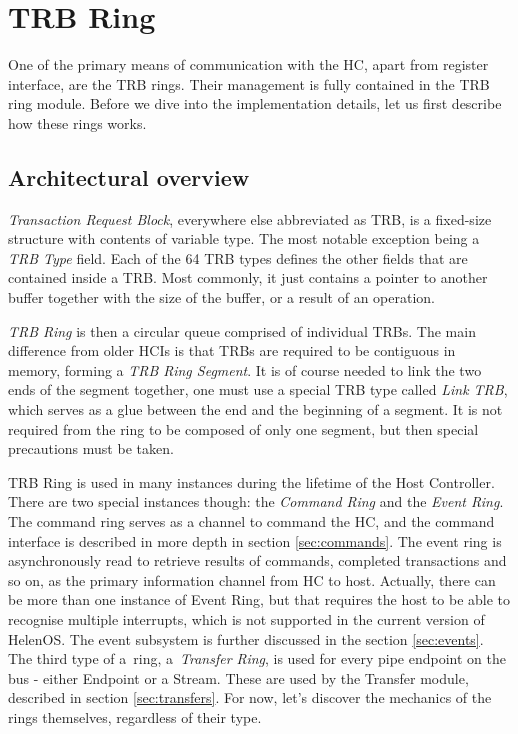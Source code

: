 \section{TRB Ring}

One of the primary means of communication with the HC, apart from register
interface, are the TRB rings. Their management is fully contained in the TRB
ring module. Before we dive into the implementation details, let us first
describe how these rings works.

\subsection{Architectural overview}

\emph{Transaction Request Block}, everywhere else abbreviated as TRB, is
a fixed-size structure with contents of variable type. The most notable
exception being a \emph{TRB Type} field. Each of the 64 TRB types defines the
other fields that are contained inside a TRB. Most commonly, it just contains
a pointer to another buffer together with the size of the buffer, or a result
of an operation.

\emph{TRB Ring} is then a circular queue comprised of individual TRBs. The main
difference from older HCIs is that TRBs are required to be contiguous in
memory, forming a \emph{TRB Ring Segment}. It is of course needed to link the
two ends of the segment together, one must use a special TRB type called
\emph{Link TRB}, which serves as a glue between the end and the beginning of
a segment. It is not required from the ring to be composed of only one segment,
but then special precautions must be taken.

TRB Ring is used in many instances during the lifetime of the Host Controller.
There are two special instances though: the \emph{Command Ring} and the
\emph{Event Ring}. The command ring serves as a channel to command the HC, and
the command interface is described in more depth in section \ref{sec:commands}.
The event ring is asynchronously read to retrieve results of commands,
completed transactions and so on, as the primary information channel from HC to
host. Actually, there can be more than one instance of Event Ring, but that
requires the host to be able to recognise multiple interrupts, which is not
supported in the current version of HelenOS. The event subsystem is further
discussed in the section \ref{sec:events}. The third type of a~ring,
a~\emph{Transfer Ring}, is used for every pipe endpoint on the bus - either
Endpoint or a Stream. These are used by the Transfer module, described in
section \ref{sec:transfers}. For now, let's discover the mechanics of the rings
themselves, regardless of their type.

